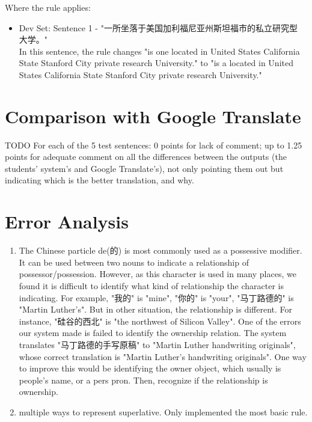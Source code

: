 \documentclass[11pt]{article} %
\begin{document}
\begin{CJK}{UTF8}{gbsn}
Where the rule applies:
\begin{itemize}
\item Dev Set: Sentence 1 - "一所坐落于美国加利福尼亚州斯坦福市的私立研究型 大学。"\\
In this sentence, the rule changes "is one located in United States California State Stanford City private research University." to "is a located in United States California State Stanford City private research University."
\end{itemize}

\section{Comparison with Google Translate}
TODO
For each of the 5 test sentences:
0 points for lack of comment;
up to 1.25 points for adequate comment on all the differences between the outputs (the students' system's and Google Translate's), not only pointing them out but indicating which is the better translation, and why.


\section{Error Analysis}
\begin{enumerate}
\item The Chinese particle de(的) is most commonly used as a possessive modifier. It can be used between two nouns to indicate a relationship of possessor/possession. However, as this character is used in many places, we found it is difficult to identify what kind of relationship the character is indicating. For example, "我的" is "mine", "你的" is "your", "马丁路德的" is "Martin Luther's". But in other situation, the relationship is different. For instance, "硅谷的西北" is "the northwest of Silicon Valley". One of the errors our system made is failed to identify the ownership relation. The system translates "马丁路德的手写原稿" to "Martin Luther handwriting originals", whose correct translation is "Martin Luther's handwriting originals". One way to improve this would be identifying the owner object, which usually is people's name, or a pers pron. Then, recognize if the relationship is ownership.

\item multiple ways to represent superlative. Only implemented the most basic rule.



\end{enumerate}
\end{CJK}
\end{document}

